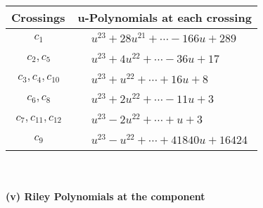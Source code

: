 \documentclass[1p]{elsarticle_modified}
\theoremstyle{definition}
\begin{document}
\begin{tabular}{m{50pt}|m{274pt}}
Crossings & \hspace{64pt}u-Polynomials at each crossing \\
\hline $$\begin{aligned}c_{1}\end{aligned}$$&$\begin{aligned}
&u^{23}+28 u^{21}+\cdots-166 u+289
\end{aligned}$\\
\hline $$\begin{aligned}c_{2},c_{5}\end{aligned}$$&$\begin{aligned}
&u^{23}+4 u^{22}+\cdots-36 u+17
\end{aligned}$\\
\hline $$\begin{aligned}c_{3},c_{4},c_{10}\end{aligned}$$&$\begin{aligned}
&u^{23}+u^{22}+\cdots+16 u+8
\end{aligned}$\\
\hline $$\begin{aligned}c_{6},c_{8}\end{aligned}$$&$\begin{aligned}
&u^{23}+2 u^{22}+\cdots-11 u+3
\end{aligned}$\\
\hline $$\begin{aligned}c_{7},c_{11},c_{12}\end{aligned}$$&$\begin{aligned}
&u^{23}-2 u^{22}+\cdots+u+3
\end{aligned}$\\
\hline $$\begin{aligned}c_{9}\end{aligned}$$&$\begin{aligned}
&u^{23}- u^{22}+\cdots+41840 u+16424
\end{aligned}$\\
\hline
\end{tabular}\\~\\
\newpage\renewcommand{\arraystretch}{1}
\flushleft \textbf{(v) Riley Polynomials at the component}\newline \\
\end{document}
